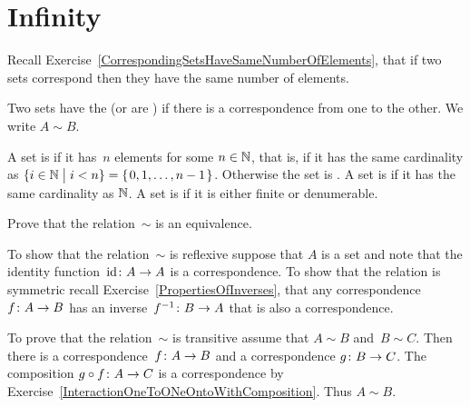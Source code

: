 \chapter{Infinity}

Recall Exercise~\ref{CorrespondingSetsHaveSameNumberOfElements},
that if two sets correspond then they have the same number of elements.

\begin{df}
Two sets have the  
(or are ) if there is a 
correspondence from one to the other.
We write $A\sim B$.   
\end{df}

\begin{df}
A set is  if it has~$n$ elements for some $n\in\mathbb{N}$,
that is, if it has the same cardinality as 
$\{i\in\mathbb{N} \bigm| i< n\}=\mbox{$\{\hspace{0.1em}0,1,\ldots,n-1\hspace{0.1em}\}$}$.
Otherwise the set is .   
A set is  if it has the same cardinality 
as $\mathbb{N}$.
A set is  if it is either finite or denumerable.
\end{df}

\begin{problem} \label{ex:EquinumeruousIsEquivalence}
Prove that the relation~$\sim$ is an equivalence.
\begin{answer}
  To show that the relation~$\sim$ is reflexive 
  suppose that $A$ is a set and note that the 
  identity function~$\mbox{$\operatorname{id}\colon A\to A$}$ is a correspondence.
  To show that the relation is symmetric recall 
  Exercise~\ref{PropertiesOfInverses}, that
  any correspondence~$\mbox{$f\colon A\to B$}$ has an inverse~$\mbox{$f^{-1}\colon B\to A$}$
  that is also a correspondence.

  To prove that the relation~$\sim$ is transitive assume that 
  $A\sim B$ and~$B\sim C$.
  Then there is a correspondence~$\mbox{$f\colon A\to B$}$ and a 
  correspondence $\mbox{$g\colon B\to C$}$.
  The composition $\mbox{$g\mathbin{\circ} f\colon A\to C$}$ is a correspondence
  by Exercise~\ref{InteractionOneToONeOntoWithComposition}.
  Thus $A\sim B$.
\end{answer}
\end{problem}

